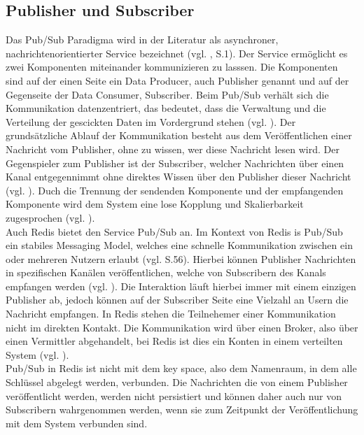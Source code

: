 
\subsection{Publisher und Subscriber}

Das \acs{Pub/Sub} Paradigma wird in der Literatur als asynchroner, nachrichtenorientierter Service bezeichnet (vgl. \cite{XinZhang}, S.1). Der Service ermöglicht es zwei Komponenten miteinander kommunizieren zu lasssen. Die Komponenten sind auf der einen Seite ein Data Producer, auch Publisher genannt und auf der Gegenseite der Data Consumer, Subscriber.
Beim \acs{Pub/Sub} verhält sich die Kommunikation datenzentriert, das bedeutet, dass die Verwaltung und die Verteilung der gescickten Daten im Vordergrund stehen (vgl. \cite{Salehi2018}).
Der grundsätzliche Ablauf der Kommunikation besteht aus dem Veröffentlichen einer Nachricht vom Publisher, ohne zu wissen, wer diese Nachricht lesen wird. Der Gegenspieler zum Publisher ist der Subscriber, welcher Nachrichten über einen Kanal entgegennimmt ohne direktes Wissen über den Publisher dieser Nachricht (vgl. \cite{Salehi2018}).
Duch die Trennung der sendenden Komponente und der empfangenden Komponente wird dem System eine lose Kopplung und Skalierbarkeit zugesprochen (vgl. \cite{Salehi2018}).
\\
Auch \acs{Redis} bietet den Service \acs{Pub/Sub} an. Im Kontext von \acs{Redis} is \acs{Pub/Sub} ein stabiles Messaging Model, welches eine schnelle Kommunikation zwischen ein oder mehreren Nutzern erlaubt (vgl. \cite{Nelson2016} S.56).
Hierbei können Publisher Nachrichten in spezifischen Kanälen veröffentlichen, welche von Subscribern des Kanals empfangen werden (vgl. \cite{Redis-PubSub}). Die Interaktion läuft hierbei immer mit einem einzigen Publisher ab, jedoch können auf der Subscriber Seite eine Vielzahl an Usern die Nachricht empfangen.
In \acs{Redis} stehen die Teilnehemer einer Kommunikation nicht im direkten Kontakt. Die Kommunikation wird über einen Broker, also über einen Vermittler abgehandelt, bei \acs{Redis} ist dies ein Konten in einem verteilten System (vgl. \cite{Redis-PubSub}).
\\
\acs{Pub/Sub} in \acs{Redis} ist nicht mit dem key space, also dem Namenraum, in dem alle Schlüssel abgelegt werden, verbunden. Die Nachrichten die von einem Publisher veröffentlicht werden, werden nicht persistiert und können daher auch nur von Subscribern wahrgenommen werden, wenn sie zum Zeitpunkt der Veröffentlichung mit dem System verbunden sind. 

